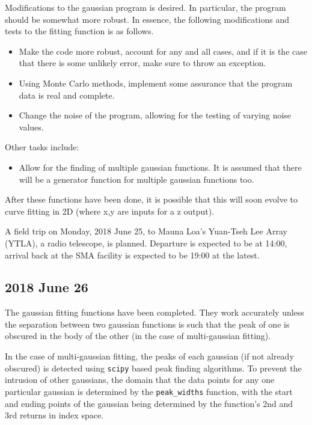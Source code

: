 \documentclass[twocolumn]{article}
\begin{document}
\begin{meetingnotes*}
	Modifications to the gaussian program is desired. In particular, the program should be somewhat more robust. In essence, the following modifications and tests to the fitting function is as follows.

	\begin{itemize}
		\item Make the code more robust, account for any and all cases, and if it is the case that there is some unlikely error, make sure to throw an exception.
		\item Using Monte Carlo methods, implement some assurance that the program data is real and complete.
		\item Change the noise of the program, allowing for the testing of varying noise values.
	\end{itemize}


	Other tasks include:
	\begin{itemize}
		\item Allow for the finding of multiple gaussian functions. It is assumed that there will be a generator function for multiple gaussian functions too.
	\end{itemize}
	After these functions have been done, it is possible that this will soon evolve to curve fitting in 2D (where x,y are inputs for a z output).
\end{meetingnotes*}

A field trip on Monday, 2018 June 25, to Mauna Loa's Yuan-Tseh Lee Array (YTLA), a radio telescope, is planned. Departure is expected to be at 14:00, arrival back at the SMA facility is expected to be 19:00 at the latest. 


\subsection{2018 June 26}
The gaussian fitting functions have been completed. They work accurately unless the separation between two gaussian functions is such that the peak of one is obscured in the body of the other (in the case of multi-gaussian fitting). 

In the case of multi-gaussian fitting, the peaks of each gaussian (if not already obscured) is detected using \texttt{scipy} based peak finding algorithms. To prevent the intrusion of other gaussians, the domain that the data points for any one particular gaussian is determined by the \texttt{peak\_widths} function, with the start and ending points of the gaussian being determined by the function's 2nd and 3rd returns in index space.
\end{document}
